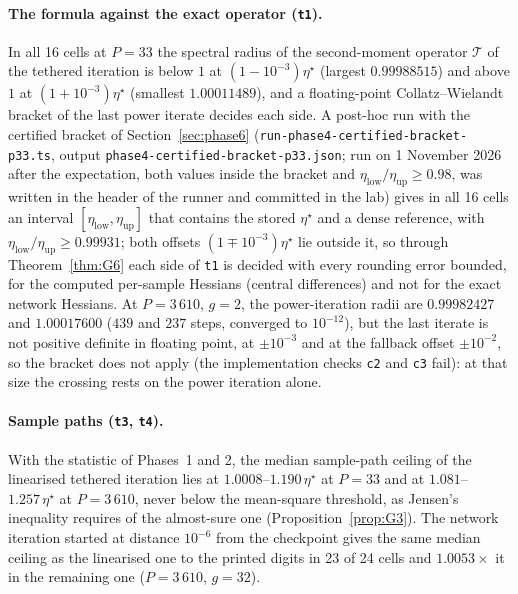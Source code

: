 \documentclass[11pt]{article}
\theoremstyle{remark}
\begin{document}
\paragraph{The formula against the exact operator (\texttt{t1}).} In all 16 cells at $P=33$ the spectral radius of the second-moment operator $\mathcal T$ of the tethered iteration is below $1$ at $(1-10^{-3})\eta^\star$ (largest $0.99988515$) and above $1$ at $(1+10^{-3})\eta^\star$ (smallest $1.00011489$), and a floating-point Collatz--Wielandt bracket of the last power iterate decides each side. A post-hoc run with the certified bracket of Section~\ref{sec:phase6} (\texttt{run-phase4-certified-bracket-p33.ts}, output \texttt{phase4-certified-bracket-p33.json}; run on 1 November 2026 after the expectation, both values inside the bracket and $\eta_{\mathrm{low}}/\eta_{\mathrm{up}}\ge0.98$, was written in the header of the runner and committed in the lab) gives in all 16 cells an interval $[\eta_{\mathrm{low}},\eta_{\mathrm{up}}]$ that contains the stored $\eta^\star$ and a dense reference, with $\eta_{\mathrm{low}}/\eta_{\mathrm{up}}\ge0.99931$; both offsets $(1\mp10^{-3})\eta^\star$ lie outside it, so through Theorem~\ref{thm:G6} each side of \texttt{t1} is decided with every rounding error bounded, for the computed per-sample Hessians (central differences) and not for the exact network Hessians. At $P=3\,610$, $g=2$, the power-iteration radii are $0.99982427$ and $1.00017600$ ($439$ and $237$ steps, converged to $10^{-12}$), but the last iterate is not positive definite in floating point, at $\pm10^{-3}$ and at the fallback offset $\pm10^{-2}$, so the bracket does not apply (the implementation checks \texttt{c2} and \texttt{c3} fail): at that size the crossing rests on the power iteration alone.

\paragraph{Sample paths (\texttt{t3}, \texttt{t4}).} With the statistic of Phases~1 and 2, the median sample-path ceiling of the linearised tethered iteration lies at $1.0008$--$1.190\,\eta^\star$ at $P=33$ and at $1.081$--$1.257\,\eta^\star$ at $P=3\,610$, never below the mean-square threshold, as Jensen's inequality requires of the almost-sure one (Proposition~\ref{prop:G3}). The network iteration started at distance $10^{-6}$ from the checkpoint gives the same median ceiling as the linearised one to the printed digits in 23 of 24 cells and $1.0053\times$ it in the remaining one ($P=3\,610$, $g=32$).
\end{document}
